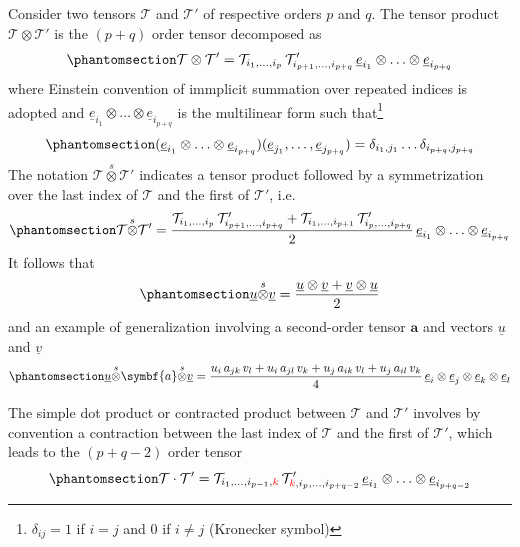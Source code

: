 \documentclass[
  a4paper,
  numbers=noendperiod,
  DIV=12]{scrreprt}
\newcommand{\uu}[1]{{\symbf{{#1}}}}
\newcommand{\uv}[1]{{\underline{{#1}}}}
\newcommand{\ve}[1]{{\uv{{e}}_{{#1}}}}
\newcommand{\sotimes}{{\stackrel{s}{\otimes}}}
\begin{document}
Consider two tensors \(\mathcal{T}\) and \(\mathcal{T}'\) of respective
orders \(p\) and \(q\). The tensor product
\(\mathcal{T}\otimes\mathcal{T}'\) is the \((p+q)\) order tensor
decomposed as \begin{equation}\protect\phantomsection\label{eq-otimes}{
\mathcal{T}\otimes\mathcal{T}'=\mathcal{T}_{i_1,\ldots,i_p} \,\mathcal{T}'_{i_{p+1},\ldots,i_{p+q}}\,
\ve{i_1}\otimes\ldots\otimes\ve{i_{p+q}}
}\end{equation} where Einstein convention of immplicit summation over
repeated indices is adopted and
\(\ve{i_1}\otimes\ldots\otimes\ve{i_{p+q}}\) is the multilinear form
such that\footnote{\(\delta_{ij}=1\) if \(i=j\) and \(0\) if \(i\neq j\)
  (Kronecker symbol)}
\begin{equation}\protect\phantomsection\label{eq-multfom}{
(\ve{i_1}\otimes\ldots\otimes\ve{i_{p+q}})(\ve{j_1},\ldots,\ve{j_{p+q}})
=
\delta_{i_1,j_1}\ldots \delta_{i_{p+q},j_{p+q}}
}\end{equation} The notation \(\mathcal{T}\sotimes\mathcal{T}'\)
indicates a tensor product followed by a symmetrization over the last
index of \(\mathcal{T}\) and the first of \(\mathcal{T}'\), i.e.
\begin{equation}\protect\phantomsection\label{eq-sotimes}{
\mathcal{T}\sotimes\mathcal{T}'=
\frac{\mathcal{T}_{i_1,\ldots,i_p} \,\mathcal{T}'_{i_{p+1},\ldots,i_{p+q}}
+
\mathcal{T}_{i_1,\ldots,i_{p+1}} \,\mathcal{T}'_{i_p,\ldots,i_{p+q}}
}{2}
\,\ve{i_1}\otimes\ldots\otimes\ve{i_{p+q}}
}\end{equation} It follows that
\begin{equation}\protect\phantomsection\label{eq-sotimesuv}{
\uv{u}\sotimes\uv{v}=\frac{\uv{u}\otimes\uv{v}+\uv{v}\otimes\uv{u}}{2}
}\end{equation} and an example of generalization involving a
second-order tensor \(\uu{a}\) and vectors \(\uv{u}\) and \(\uv{v}\)
\begin{equation}\protect\phantomsection\label{eq-sotimesuav}{
\uv{u}\sotimes\uu{a}\sotimes\uv{v}=
\frac{u_i\,a_{jk}\,v_l+u_i\,a_{jl}\,v_k+u_j\,a_{ik}\,v_l+u_j\,a_{il}\,v_k}{4}
\,\ve{i}\otimes\ve{j}\otimes\ve{k}\otimes\ve{l}
}\end{equation}

The simple dot product or contracted product between \(\mathcal{T}\) and
\(\mathcal{T}'\) involves by convention a contraction between the last
index of \(\mathcal{T}\) and the first of \(\mathcal{T}'\), which leads
to the \((p+q-2)\) order tensor
\begin{equation}\protect\phantomsection\label{eq-simpledot}{
\mathcal{T}\cdot\mathcal{T}'=\mathcal{T}_{i_1,\ldots,i_{p-1},{\color{red}k}} \,\mathcal{T}'_{{\color{red}k},i_{p},\ldots,i_{p+q-2}}\,
\ve{i_1}\otimes\ldots\otimes\ve{i_{p+q-2}}
}\end{equation}
\end{document}
